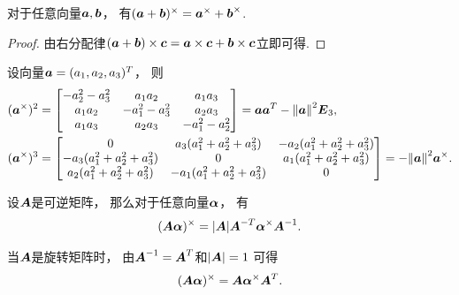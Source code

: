 \begin{property}
对于任意向量\(\boldsymbol{a},\boldsymbol{b}\)，
有\((\boldsymbol{a} + \boldsymbol{b})^\times = \boldsymbol{a}^\times + \boldsymbol{b}^\times\).
\begin{proof}
由右分配律\((\boldsymbol{a} + \boldsymbol{b}) \times \boldsymbol{c} = \boldsymbol{a} \times \boldsymbol{c} + \boldsymbol{b} \times \boldsymbol{c}\)立即可得.
\end{proof}
\end{property}

\begin{example}
设向量\(\boldsymbol{a} = (a_1,a_2,a_3)^T\)，
则\begin{align*}
	(\boldsymbol{a}^\times)^2
	&= \begin{bmatrix}
		-a_2^2-a_3^2 & a_1 a_2 & a_1 a_3 \\
		a_1 a_2 & -a_1^2-a_3^2 & a_2 a_3 \\
		a_1 a_3 & a_2 a_3 & -a_1^2-a_2^2 \\
	\end{bmatrix}
	= \boldsymbol{a} \boldsymbol{a}^T - \norm{\boldsymbol{a}}^2 \boldsymbol{E}_3,
	\\
	(\boldsymbol{a}^\times)^3
	&= \begin{bmatrix}
		0 & a_3 (a_1^2+a_2^2+a_3^2) & -a_2 (a_1^2+a_2^2+a_3^2) \\
		-a_3 (a_1^2+a_2^2+a_3^2) & 0 & a_1 (a_1^2+a_2^2+a_3^2) \\
		a_2 (a_1^2+a_2^2+a_3^2) & -a_1 (a_1^2+a_2^2+a_3^2) & 0 \\
	\end{bmatrix}
	= -\norm{\boldsymbol{a}}^2 \boldsymbol{a}^\times.
\end{align*}
\end{example}

\begin{example}
设\(\boldsymbol{A}\)是可逆矩阵，
那么对于任意向量\(\boldsymbol\alpha\)，
有\begin{equation*}
	(\boldsymbol{A} \boldsymbol\alpha)^\times
	= \abs{\boldsymbol{A}}
	\boldsymbol{A}^{-T}
	\boldsymbol\alpha^\times
	\boldsymbol{A}^{-1}.
\end{equation*}
\end{example}
\begin{remark}
当\(\boldsymbol{A}\)是旋转矩阵时，
由\(\boldsymbol{A}^{-1} = \boldsymbol{A}^T\)和\(\abs{\boldsymbol{A}} = 1\)
可得\begin{equation*}
	(\boldsymbol{A} \boldsymbol\alpha)^\times
	= \boldsymbol{A}
	\boldsymbol\alpha^\times
	\boldsymbol{A}^T.
\end{equation*}
\end{remark}

